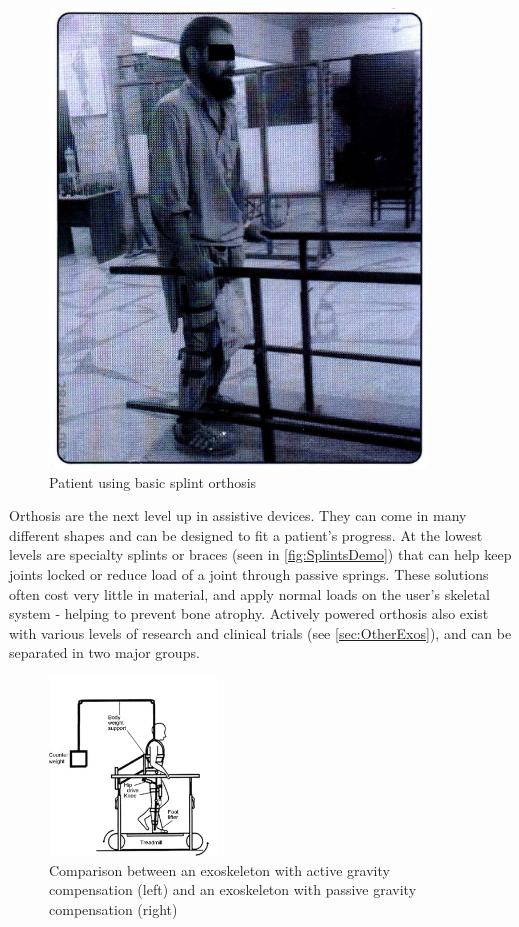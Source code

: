 \begin{figure} [ht!]
    \centering
    \includegraphics[width=0.4\linewidth]{Figures/Background/SplintsDemo.png}
    \caption{Patient using basic splint orthosis \cite{RehabParaplegia}}
    \label{fig:SplintsDemo}
\end{figure}

Orthosis are the next level up in assistive devices. They can come in many different shapes and can be designed to fit a patient's progress. At the lowest levels are specialty splints or braces (seen in \autoref{fig:SplintsDemo}) that can help keep joints locked or reduce load of a joint through passive springs. These solutions often cost very little in material, and apply normal loads on the user's skeletal system - helping to prevent bone atrophy. Actively powered orthosis also exist with various levels of research and clinical trials (see \autoref{sec:OtherExos}), and can be separated in two major groups. 

\begin{figure}[ht!]
    \centering
    \includegraphics[width=0.4\textwidth]{Figures/Background/ExoSeparateGravityComp.png}
    \caption{Comparison between an exoskeleton with active gravity compensation (left) and an exoskeleton with passive gravity compensation (right) \cite{GaitTrainingClinical}}
    \label{fig:ExoTypesGCSCompared}
\end{figure}

